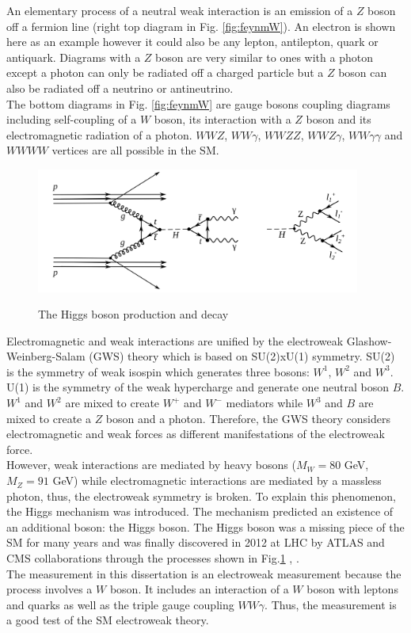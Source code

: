 An elementary process of a neutral weak interaction is an emission of a $Z$ boson off a fermion line (right top diagram in Fig. \ref{fig:feynmW}). An electron is shown here as an example however it could also be any lepton, antilepton, quark or antiquark. Diagrams with a $Z$ boson are very similar to ones with a photon except a photon can only be radiated off a charged particle but a $Z$ boson can also be radiated off a neutrino or antineutrino.\\

The bottom diagrams in Fig. \ref{fig:feynmW} are gauge bosons coupling diagrams including self-coupling of a $W$ boson, its interaction with a $Z$ boson and its electromagnetic radiation of a photon. $WWZ$, $WW\gamma$, $WWZZ$, $WWZ\gamma$, $WW\gamma\gamma$ and $WWWW$ vertices are all possible in the SM.\\

\begin{figure}[htb]
  \begin{center}
    {\includegraphics[width=0.95\textwidth]{../figs/Intro/FeynmanHiggs.png}}
    \caption{The Higgs boson production and decay}
    \label{fig:higgsProduction}
  \end{center}
\end{figure}

Electromagnetic and weak interactions are unified by the electroweak Glashow-Weinberg-Salam (GWS) theory which is based on SU(2)xU(1) symmetry. SU(2) is the symmetry of weak isospin which generates three bosons: $W^1$, $W^2$ and $W^3$. U(1) is the symmetry of the weak hypercharge and generate one neutral boson $B$. $W^1$ and $W^2$ are mixed to create $W^+$ and $W^-$ mediators while $W^3$ and $B$ are mixed to create a $Z$ boson and a photon. Therefore, the GWS theory considers electromagnetic and weak forces as different manifestations of the electroweak force. \\

However, weak interactions are mediated by heavy bosons ($M_W=80$ GeV, $M_Z=91$ GeV) while electromagnetic interactions are mediated by a massless photon, thus, the electroweak symmetry is broken. To explain this phenomenon, the Higgs mechanism was introduced. The mechanism predicted an existence of an additional boson: the Higgs boson. The Higgs boson was a missing piece of the SM for many years and was finally discovered in 2012 at LHC by ATLAS and CMS collaborations through the processes shown in Fig.\ref{fig:higgsProduction} \cite{ref_HiggsPaperCMS}, \cite{ref_HiggsPaperATLAS}.\\


The measurement in this dissertation is an electroweak measurement because the process involves a $W$ boson. It includes an interaction of a $W$ boson with leptons and quarks as well as the triple gauge coupling $WW\gamma$. Thus, the measurement is a good test of the SM electroweak theory.\\ 




